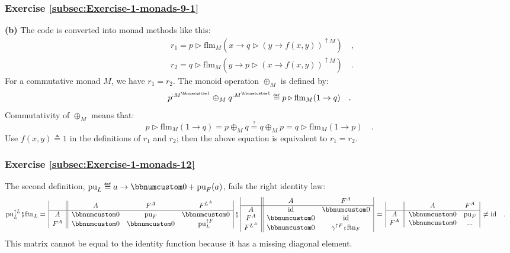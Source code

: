 \subsubsection*{Exercise \ref{subsec:Exercise-1-monads-9-1}}

\textbf{(b)} The code is converted into monad methods like this:
\begin{align*}
 & r_{1}=p\triangleright\text{flm}_{M}(x\rightarrow q\triangleright(y\rightarrow f(x,y))^{\uparrow M})\quad,\\
 & r_{2}=q\triangleright\text{flm}_{M}(y\rightarrow p\triangleright(x\rightarrow f(x,y))^{\uparrow M})\quad.
\end{align*}
For a commutative monad $M$, we have $r_{1}=r_{2}$. The monoid operation
$\oplus_{M}$ is defined by:
\[
p^{:M^{\bbnum 1}}\oplus_{M}q^{:M^{\bbnum 1}}\triangleq p\triangleright\text{flm}_{M}(1\rightarrow q)\quad.
\]
Commutativity of $\oplus_{M}$ means that:
\[
p\triangleright\text{flm}_{M}(1\rightarrow q)=p\oplus_{M}q\overset{?}{=}q\oplus_{M}p=q\triangleright\text{flm}_{M}(1\rightarrow p)\quad.
\]
Use $f(x,y)\triangleq1$ in the definitions of $r_{1}$ and $r_{2}$;
then the above equation is equivalent to $r_{1}=r_{2}$.

\subsubsection*{Exercise \ref{subsec:Exercise-1-monads-12}}

The second definition, $\text{pu}_{L}\triangleq a\rightarrow\bbnum 0+\text{pu}_{F}(a)$,
fails the right identity law:
\begin{align*}
 & \text{pu}_{L}^{\uparrow L}\bef\text{ftn}_{L}=\,\begin{array}{|c||ccc|}
 & A & F^{A} & F^{L^{A}}\\
\hline A & \bbnum 0 & \text{pu}_{F} & \bbnum 0\\
F^{A} & \bbnum 0 & \bbnum 0 & \text{pu}_{L}^{\uparrow F}
\end{array}\,\bef\,\begin{array}{|c||cc|}
 & A & F^{A}\\
\hline A & \text{id} & \bbnum 0\\
F^{A} & \bbnum 0 & \text{id}\\
F^{L^{A}} & \bbnum 0 & \gamma^{\uparrow F}\bef\text{ftn}_{F}
\end{array}\,=\,\begin{array}{|c||cc|}
 & A & F^{A}\\
\hline A & \bbnum 0 & \text{pu}_{F}\\
F^{A} & \bbnum 0 & ...
\end{array}\,\neq\text{id}\quad.
\end{align*}
This matrix cannot be equal to the identity function because it has
a missing diagonal element.

